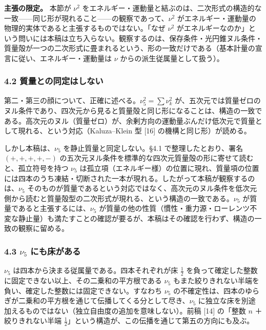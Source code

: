 \documentclass[
]{ltjsarticle}
\begin{document}
\textbf{主張の限定。} 本節が \(\nu^2\)
をエネルギー・運動量と結ぶのは、二次形式の構造的な一致------同じ形が現れること------の観察であって、\(\nu^2\)
がエネルギー・運動量の物理的実体であると主張するものではない。「なぜ
\(\nu^2\)
がエネルギーなのか」という問いには本稿は立ち入らない。観察するのは、保存条件・光円錐ヌル条件・質量殻が一つの二次形式に畳まれるという、形の一致だけである（基本計量の宣言に従い、エネルギー・運動量は
\(\nu\) からの派生従属量として扱う）。

\subsubsection{4.2
質量との同定はしない}\label{ux8ceaux91cfux3068ux306eux540cux5b9aux306fux3057ux306aux3044}

第二・第三の顔について、正確に述べる。\(\nu_5^2=\sum\nu_k^2\)
が、五次元では質量ゼロのヌル条件であり、四次元から見ると質量殻と同じ形になることは、構造の一致である。高次元のヌル（質量ゼロ）が、余剰方向の運動量ぶんだけ低次元で質量として現れる、という対応（Kaluza--Klein
型 {[}16{]} の機構と同じ形）が読める。

しかし本稿は、\(\nu_5\) を静止質量と同定しない。§4.1
で整理したとおり、署名 \((+,+,+,+,-)\)
の五次元ヌル条件を標準的な四次元質量殻の形に寄せて読むと、孤立符号を持つ
\(\nu_5\)
は孤立項（エネルギー様）の位置に現れ、質量項の位置には四本のうち凍結・切断された一本が現れる。したがって本稿が観察するのは、\(\nu_5\)
そのものが質量であるという対応ではなく、高次元のヌル条件を低次元側から読むと質量殻型の二次形式が現れる、という構造の一致である。\(\nu_5\)
が質量であると主張するには、\(\nu_5\)
が質量の他の性質（慣性・重力源・ローレンツ不変な静止量）も満たすことの確認が要るが、本稿はその確認を行わず、構造の一致の観察に留める。

\subsubsection{\texorpdfstring{4.3 \(\nu_5\)
にも床がある}{4.3 \textbackslash nu\_5 にも床がある}}\label{nu_5-ux306bux3082ux5e8aux304cux3042ux308b}

\(\nu_5\) は四本から決まる従属量である。四本それぞれが床 \(\tfrac12\)
を負って確定した整数に固定できない以上、その二乗和の平方根である
\(\nu_5\)
もまた絞りきれない半端を負い、確定した整数には固定できない。すなわち
\(\nu_5\)
の不確定性は、四本のゆらぎが二乗和の平方根を通じて伝播してくる分として尽き、\(\nu_5\)
に独立な床を別途加えるものではない（独立自由度の追加を意味しない）。前稿
{[}14{]} の「整数 \(n\) ＋絞りきれない半端
\(\tfrac12\)」という構造が、この伝播を通じて第五の方向にも及ぶ。
\end{document}
